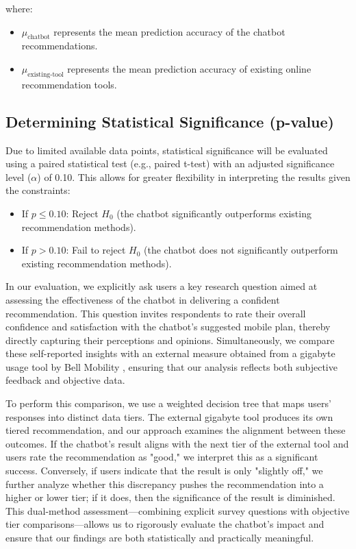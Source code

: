 \documentclass[conference]{IEEEtran}
\begin{document}
where:
\begin{itemize}
\item $\mu_{\text{chatbot}}$ represents the mean prediction accuracy of the chatbot recommendations.
\item $\mu_{\text{existing-tool}}$ represents the mean prediction accuracy of existing online recommendation tools.
\end{itemize}

\subsection{Determining Statistical Significance (p-value)}
Due to limited available data points, statistical significance will be evaluated using a paired statistical test (e.g., paired t-test) with an adjusted significance level ($\alpha$) of 0.10. This allows for greater flexibility in interpreting the results given the constraints:

\begin{itemize}
\item If $p \leqslant 0.10$: Reject $H_0$ (the chatbot significantly outperforms existing recommendation methods).
\item If $p > 0.10$: Fail to reject $H_0$ (the chatbot does not significantly outperform existing recommendation methods).
\end{itemize}
In our evaluation, we explicitly ask users a key research question aimed at assessing the effectiveness of the chatbot in delivering a confident recommendation. This question invites respondents to rate their overall confidence and satisfaction with the chatbot's suggested mobile plan, thereby directly capturing their perceptions and opinions. Simultaneously, we compare these self-reported insights with an external measure obtained from a gigabyte usage tool by Bell Mobility \cite{BellUsageCalc}, ensuring that our analysis reflects both subjective feedback and objective data.

To perform this comparison, we use a weighted decision tree that maps users’ responses into distinct data tiers. The external gigabyte tool produces its own tiered recommendation, and our approach examines the alignment between these outcomes. If the chatbot’s result aligns with the next tier of the external tool and users rate the recommendation as "good," we interpret this as a significant success. Conversely, if users indicate that the result is only "slightly off," we further analyze whether this discrepancy pushes the recommendation into a higher or lower tier; if it does, then the significance of the result is diminished. This dual-method assessment—combining explicit survey questions with objective tier comparisons—allows us to rigorously evaluate the chatbot's impact and ensure that our findings are both statistically and practically meaningful.
\end{document}
